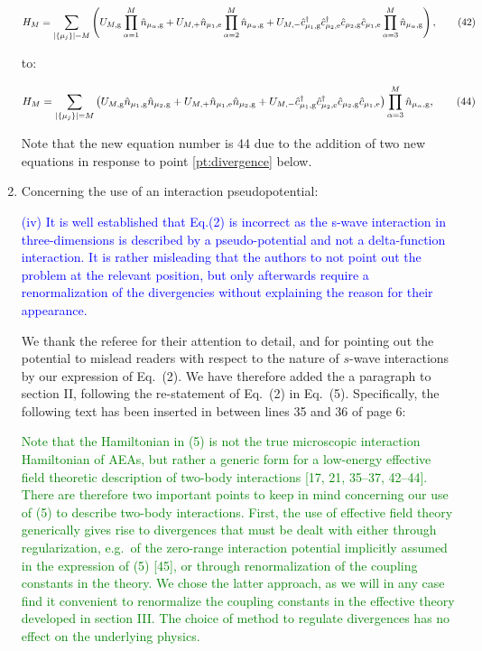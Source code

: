 \documentclass[preprint]{revtex4-1}
\newcommand{\p}[1]{\left(#1\right)} %
\renewcommand{\set}[1]{\left\{#1\right\}} %
\newcommand{\g}{\text{g}}
\newcommand{\e}{\text{e}}
\renewcommand{\c}{\hat{c}}
\newcommand{\n}{\hat{n}}
\newcommand{\1}{\mathds{1}}
\newcommand{\blue}[1]{\textcolor{blue}{#1}}
\newcommand{\red}[1]{\textcolor{red}{#1}}
\newcommand{\green}[1]{\textcolor{green}{#1}}
\begin{document}
\begin{enumerate}
  \red{\begin{align*}
      H_M = \sum_{\abs{\set{\mu_j}}=M}
      \p{U_{M,\g} \prod_{\alpha=1}^M \n_{\mu_\alpha,\g}
        + U_{M,+} \n_{\mu_1,\e} \prod_{\alpha=2}^M \n_{\mu_\alpha,\g}
        + U_{M,-} \c_{\mu_1,\g}^\dag \c_{\mu_2,\e}^\dag
        \c_{\mu_2,\g} \c_{\mu_1,\e} \prod_{\alpha=3}^M \n_{\mu_\alpha,\g}},
      \tag{42}
    \end{align*}}

  to:

  \green{\begin{align*}
      H_M = \sum_{\abs{\set{\mu_j}}=M}
      \p{U_{M,\g} \n_{\mu_1,\g} \n_{\mu_2,\g}
        + U_{M,+} \n_{\mu_1,\e} \n_{\mu_2,\g}
        + U_{M,-} \c_{\mu_1,\g}^\dag \c_{\mu_2,\e}^\dag
        \c_{\mu_2,\g} \c_{\mu_1,\e}}
      \prod_{\alpha=3}^M \n_{\mu_\alpha,\g},
      \tag{44}
    \end{align*}}

  Note that the new equation number is 44 due to the addition of two
  new equations in response to point \ref{pt:divergence} below.


\item Concerning the use of an interaction pseudopotential:

  \blue{(iv) It is well established that Eq.(2) is incorrect as the
    s-wave interaction in three-dimensions is described by a
    pseudo-potential and not a delta-function interaction. It is
    rather misleading that the authors to not point out the problem at
    the relevant position, but only afterwards require a
    renormalization of the divergencies without explaining the reason
    for their appearance.}

  \label{pt:pseudo-potential}

  We thank the referee for their attention to detail, and for pointing
  out the potential to mislead readers with respect to the nature of
  $s$-wave interactions by our expression of Eq.~(2).  We have
  therefore added the a paragraph to section II, following the
  re-statement of Eq.~(2) in Eq.~(5).  Specifically, the following
  text has been inserted in between lines 35 and 36 of page 6:

  \green{Note that the Hamiltonian in (5) is not the true microscopic
    interaction Hamiltonian of AEAs, but rather a generic form for a
    low-energy effective field theoretic description of two-body
    interactions [17, 21, 35--37, 42--44].  There are therefore two
    important points to keep in mind concerning our use of (5) to
    describe two-body interactions.  First, the use of effective field
    theory generically gives rise to divergences that must be dealt
    with either through regularization, e.g.~of the zero-range
    interaction potential implicitly assumed in the expression of (5)
    [45], or through renormalization of the coupling constants in the
    theory.  We chose the latter approach, as we will in any case find
    it convenient to renormalize the coupling constants in the
    effective theory developed in section III.  The choice of method
    to regulate divergences has no effect on the underlying physics.}


\end{enumerate}
\end{document}

